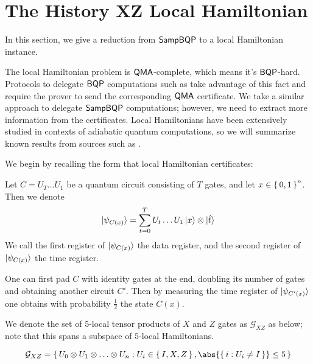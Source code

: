 \section{The History XZ Local Hamiltonian}
\label{sec:Hamiltonian}

In this section, we give a reduction from $\operatorname{\mathsf{SampBQP}}$ to a local Hamiltonian instance.

The local Hamiltonian problem is $\operatorname{\mathsf{QMA}}$-complete, which means it's $\operatorname{\mathsf{BQP}}$-hard.
Protocols to delegate $\operatorname{\mathsf{BQP}}$ computations such as \cite{mahadev_delegation}  take advantage of this fact and require the prover to send the corresponding $\operatorname{\mathsf{QMA}}$ certificate.
We take a similar approach to delegate $\operatorname{\mathsf{SampBQP}}$ computations; however, we need to extract more information from the certificates.
Local Hamiltonians have been extensively studied in contexts of adiabatic quantum computations, so we will summarize known results from sources such as \cite{adiabatic}.

We begin by recalling the form that local Hamiltonian certificates:

\begin{dfn}
	\label{dfn:groundstate}	
	Let $C=U_T\ldots U_1$ be a quantum circuit consisting of $T$ gates, and let $x\in\set{0,1}^n$. Then we denote
	$$\ket{\psi_{C(x)}}=\sum_{t=0}^TU_t\ldots U_1\ket{x}\otimes\ket{\hat{t}}$$
	We call the first register of $\ket{\psi_{C(x)}}$ the data register, and the second register of $\ket{\psi_{C(x)}}$ the time register.
\end{dfn}

\begin{rmk}
	\label{idpadding}
	One can first pad $C$ with identity gates at the end, doubling its number of gates and obtaining another circuit $C'$.
	Then by measuring the time register of $\ket{\psi_{C'(x)}}$ one obtains with probability $\frac{1}{2}$ the state $C(x)$.
\end{rmk}

We denote the set of $5$-local tensor products of $X$ and $Z$ gates as $\mathcal{G}_{XZ}$ as below; note that this spans a subspace of $5$-local Hamiltonians.
\begin{dfn}
	$$\mathcal{G}_{XZ}=\set{U_0\otimes U_1\otimes\ldots\otimes U_n: U_i\in\set{I,X,Z}, \abs{\set{i: U_i\ne I}}\leq 5}$$
\end{dfn}


